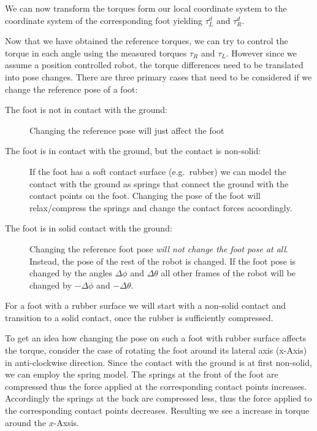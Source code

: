\documentclass[english,ngerman]{KITreprt}
\newcommand{\clr}[2]{{\color{#1}{#2}}}
\newcommand{\todo}[1]{\marginpar{\clr{red}{#1}}}
\begin{document}
We can now transform the torques form our local coordinate system to the
coordinate system of the corresponding foot yielding $\tau^d_L$ and
$\tau^d_R$.

\todo{Cite kajita paper from 2005 that outlines the motivation for doing pose control}

Now that we have obtained the reference torques, we can try to control
the torque in each angle using the measured torques $\tau_R$ and
$\tau_L$. However since we assume a position controlled robot, the
torque differences need to be translated into pose changes. There are
three primary cases that need to be considered if we change the
reference pose of a foot:

\todo{image with springs}

\begin{description}
\item[The foot is not in contact with the ground:]
Changing the reference pose will just affect the foot
\item[The foot is in contact with the ground, but the contact is
non-solid:]
If the foot has a soft contact surface (e.g.~rubber) we can model the
contact with the ground as springs that connect the ground with the
contact points on the foot. Changing the pose of the foot will
relax/compress the springs and change the contact forces acoordingly.
\item[The foot is in solid contact with the ground:]
Changing the reference foot pose \emph{will not change the foot pose at
all}. Instead, the pose of the rest of the robot is changed. If the foot
pose is changed by the angles $\Delta \phi$ and $\Delta \theta$ all
other frames of the robot will be changed by $-\Delta \phi$ and
$-\Delta \theta$.
\end{description}

\todo{IK model <-> real robot}

For a foot with a rubber surface we will start with a non-solid contact
and transition to a solid contact, once the rubber is sufficiently
compressed.

To get an idea how changing the pose on such a foot with rubber surface
affects the torque, consider the case of rotating the foot around its
lateral axis (x-Axis) in anti-clockwise direction. Since the contact
with the ground is at first non-solid, we can employ the spring model.
The springs at the front of the foot are compressed thus the force
applied at the corresponding contact points increases. Accordingly the
springs at the back are compressed less, thus the force applied to the
corresponding contact points decreases. Resulting we see a increase in
torque around the $x$-Axsis.
\end{document}
